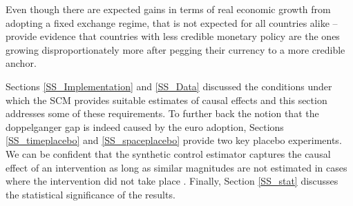 \documentclass[12pt]{article}
\begin{document}
Even though there are expected gains in terms of real economic growth from adopting a fixed exchange regime, that is not expected for all countries alike -- \cite{Arvai2023} provide evidence that countries with less credible monetary policy are the ones growing disproportionately more after pegging their currency to a more credible anchor.  

Sections \ref{SS_Implementation} and \ref{SS_Data} discussed the conditions under which the SCM provides suitable estimates of causal effects and this section addresses some of these requirements. To further back the notion that the doppelganger gap is indeed caused by the euro adoption, Sections \ref{SS_timeplacebo} and \ref{SS_spaceplacebo} provide two key placebo experiments. We can be confident that the synthetic control estimator captures the causal effect of an intervention as long as similar magnitudes are not estimated in cases where the intervention did not take place \citep{Born2018}. Finally, Section \ref{SS_stat} discusses the statistical significance of the results. 

\end{document}

